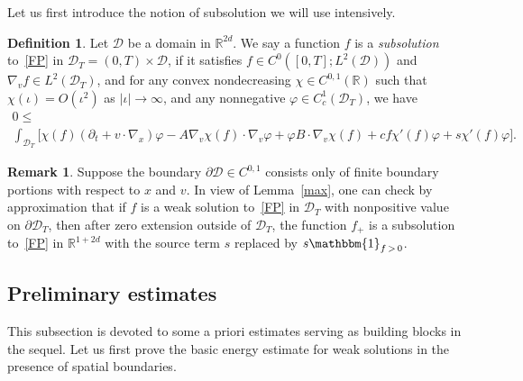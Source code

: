 \documentclass[10pt]{amsart}
\theoremstyle{definition}\newtheorem{defi}[theo]{Definition}\newtheorem{rema}[theo]{Remark}\newtheorem{exam}[theo]{Example}\newtheorem{exem}[theo]{Example}\newtheorem{nota}[theo]{Notation}
\newcommand*\p{\partial}
\newcommand*\R {\mathbb{R}}
\newcommand*\D {\mathcal{D}}
\begin{document}
Let us first introduce the notion of subsolution we will use intensively.

\begin{defi}
Let $\D$ be a domain in $\R^{2d}$. We say a function $f$ is a \emph{subsolution} to~\eqref{FP} in $\D_T=(0,T)\times\D$, if it satisfies $f\in C^0([0,T];L^2(\D))$ and $\nabla_vf\in L^2(\D_T)$, and for any convex nondecreasing $\chi\in C^{0,1}(\R)$ such that $\chi(\iota)=O(\iota^2)$ as $|\iota|\rightarrow\infty$, and any nonnegative $\varphi\in C^1_c(\D_T)$, we have
\begin{multline*}
0\le\\
\int_{\D_T} \big[\chi(f)(\p_t+v\cdot\nabla_x)\varphi -A\nabla_v\chi(f) \cdot\nabla_v\varphi
+ \varphi B\cdot\nabla_v\chi(f) + cf\chi'(f)\varphi +s\chi'(f)\varphi\big].
\end{multline*}
\end{defi}

\begin{rema}
Suppose the boundary $\p\D\in C^{0,1}$ consists only of finite boundary portions with respect to $x$ and $v$. In view of Lemma~\ref{max}, one can check by approximation that if $f$ is a weak solution to~\eqref{FP} in $\D_T$ with nonpositive value on $\p\D_T$, then after zero extension outside of $\D_T$, the function $f_+$ is a subsolution to~\eqref{FP} in $\R^{1+2d}$ with the source term $s$ replaced by $s\mathbbm{1}_{f\,>\,0}$.
\end{rema}

\subsection{Preliminary estimates}

This subsection is devoted to some a priori estimates serving as building blocks in the sequel. Let us first prove the basic energy estimate for weak solutions in the presence of spatial boundaries.
\end{document}
